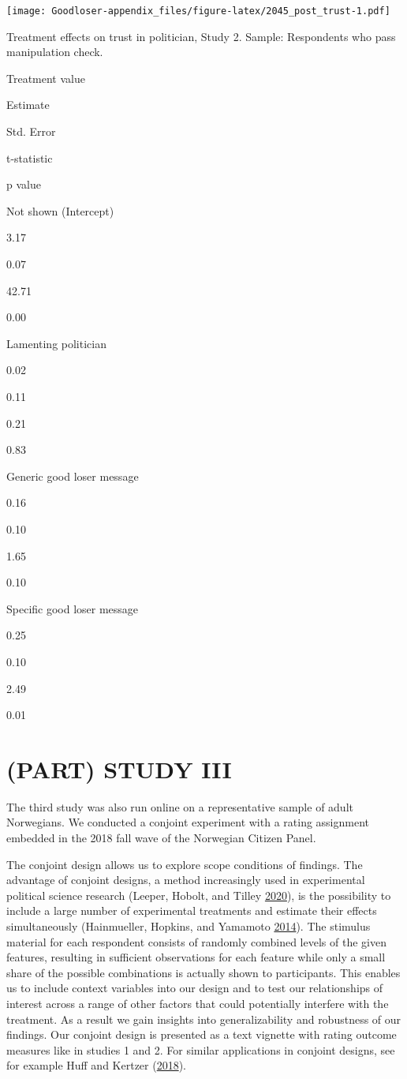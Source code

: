 \documentclass[
]{book}
\begin{document}
\texttt{[image: Goodloser-appendix\_files/figure-latex/2045\_post\_trust-1.pdf]}

Treatment effects on trust in politician, Study 2. Sample: Respondents
who pass manipulation check.

Treatment value

Estimate

Std. Error

t-statistic

p value

Not shown (Intercept)

3.17

0.07

42.71

0.00

Lamenting politician

0.02

0.11

0.21

0.83

Generic good loser message

0.16

0.10

1.65

0.10

Specific good loser message

0.25

0.10

2.49

0.01

\hypertarget{part-study-iii}{%
\chapter{(PART) STUDY III}\label{part-study-iii}}

The third study was also run online on a representative sample of adult
Norwegians. We conducted a conjoint experiment with a rating assignment
embedded in the 2018 fall wave of the Norwegian Citizen Panel.

The conjoint design allows us to explore scope conditions of findings.
The advantage of conjoint designs, a method increasingly used in
experimental political science research (Leeper, Hobolt, and Tilley
\protect\hyperlink{ref-leeper2020measuring}{2020}), is the possibility
to include a large number of experimental treatments and estimate their
effects simultaneously (Hainmueller, Hopkins, and Yamamoto
\protect\hyperlink{ref-hainmueller2014causal}{2014}). The stimulus
material for each respondent consists of randomly combined levels of the
given features, resulting in sufficient observations for each feature
while only a small share of the possible combinations is actually shown
to participants. This enables us to include context variables into our
design and to test our relationships of interest across a range of other
factors that could potentially interfere with the treatment. As a result
we gain insights into generalizability and robustness of our findings.
Our conjoint design is presented as a text vignette with rating outcome
measures like in studies 1 and 2. For similar applications in conjoint
designs, see for example Huff and Kertzer
(\protect\hyperlink{ref-huff2018public}{2018}).
\end{document}
